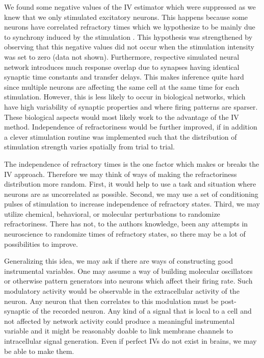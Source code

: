 \documentclass[11pt]{article}
\begin{document}
We found some negative values of the IV estimator which were suppressed as we knew that we only stimulated excitatory neurons. This happens because some neurons  have correlated refractory times which we hypothesize to be mainly due to synchrony induced by the stimulation \citep{ermentrout2008reliability}. This hypothesis was strengthened by observing that this negative values did not occur when the stimulation intensity was set to zero (data not shown). Furthermore, respective simulated neural network introduces much response overlap due to synapses having identical synaptic time constants and transfer delays. This makes inference quite hard since multiple neurons are affecting the same cell at the same time for each stimulation.  However, this is less likely to occur in biological networks, which have high variability of synaptic properties and where firing patterns are sparser. These biological aspects would most likely work to the advantage of the IV method. Independence of refractoriness would be further improved, if in addition a clever stimulation routine was implemented such that the distribution of stimulation strength varies spatially from trial to trial.

The independence of refractory times is the one factor which makes or breaks the IV approach. Therefore we may think of ways of making the refractoriness distribution more random. First, it would help to use a task and situation where neurons are as uncorrelated as possible. Second, we may use a set of conditioning pulses of stimulation to increase independence of refractory states. Third, we may utilize chemical, behavioral, or molecular perturbations to randomize refractoriness. There has not, to the authors knowledge, been any attempts in neuroscience to randomize times of refractory states, so there may be a lot of possibilities to improve.

Generalizing this idea, we may ask if there are ways of constructing good instrumental variables. One may assume a way of building molecular oscillators or otherwise pattern generators into neurons which affect their firing rate. Such modulatory activity would be observable in the extracellular activity of the neuron. Any neuron that then correlates to this modulation must be post-synaptic of the recorded neuron. Any kind of a signal that is local to a cell and not affected by network activity could produce a meaningful instrumental variable and it might be reasonably doable to link membrane channels to intracellular signal generation. Even if perfect IVs do not exist in brains, we may be able to make them.
\end{document}
